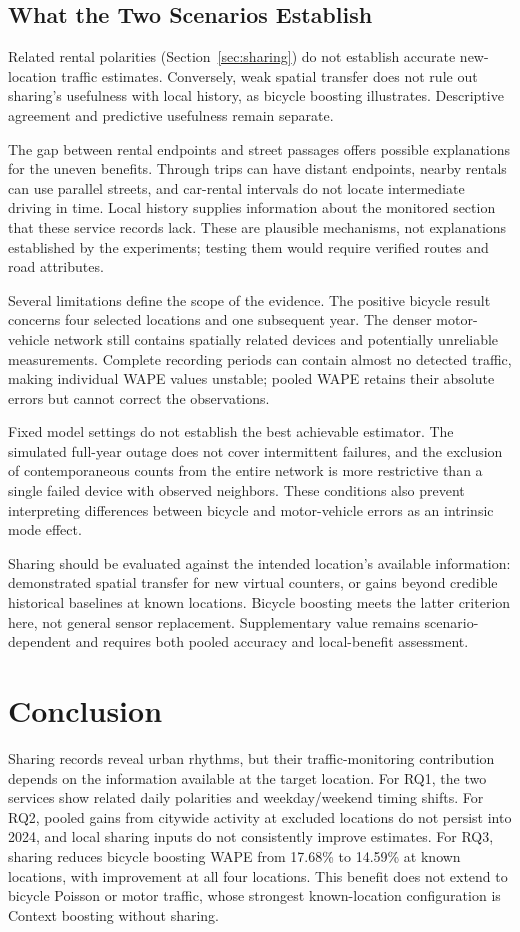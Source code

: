 \documentclass[]{interact}
\begin{document}
\subsection{What the Two Scenarios Establish}
Related rental polarities (Section~\ref{sec:sharing}) do not establish accurate new-location traffic estimates. Conversely, weak spatial transfer does not rule out sharing's usefulness with local history, as bicycle boosting illustrates. Descriptive agreement and predictive usefulness remain separate.

The gap between rental endpoints and street passages offers possible explanations for the uneven benefits. Through trips can have distant endpoints, nearby rentals can use parallel streets, and car-rental intervals do not locate intermediate driving in time. Local history supplies information about the monitored section that these service records lack. These are plausible mechanisms, not explanations established by the experiments; testing them would require verified routes and road attributes.

Several limitations define the scope of the evidence. The positive bicycle result concerns four selected locations and one subsequent year. The denser motor-vehicle network still contains spatially related devices and potentially unreliable measurements. Complete recording periods can contain almost no detected traffic, making individual WAPE values unstable; pooled WAPE retains their absolute errors but cannot correct the observations.

Fixed model settings do not establish the best achievable estimator. The simulated full-year outage does not cover intermittent failures, and the exclusion of contemporaneous counts from the entire network is more restrictive than a single failed device with observed neighbors. These conditions also prevent interpreting differences between bicycle and motor-vehicle errors as an intrinsic mode effect.

Sharing should be evaluated against the intended location's available information: demonstrated spatial transfer for new virtual counters, or gains beyond credible historical baselines at known locations. Bicycle boosting meets the latter criterion here, not general sensor replacement. Supplementary value remains scenario-dependent and requires both pooled accuracy and local-benefit assessment.

\section{Conclusion}
\label{sec:conclusion}
Sharing records reveal urban rhythms, but their traffic-monitoring contribution depends on the information available at the target location. For RQ1, the two services show related daily polarities and weekday/weekend timing shifts. For RQ2, pooled gains from citywide activity at excluded locations do not persist into 2024, and local sharing inputs do not consistently improve estimates. For RQ3, sharing reduces bicycle boosting WAPE from 17.68\% to 14.59\% at known locations, with improvement at all four locations. This benefit does not extend to bicycle Poisson or motor traffic, whose strongest known-location configuration is Context boosting without sharing.
\end{document}
